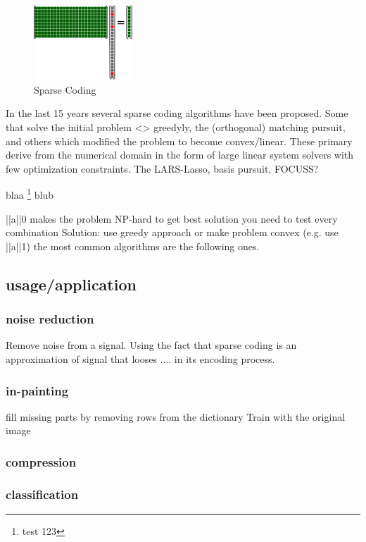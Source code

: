 \begin{figure}
\includegraphics[width = 0.33\textwidth]{images/Da_x.pdf} %
\caption{Sparse Coding}
\label{fig:da_x}
\end{figure}


In the last 15 years several sparse coding algorithms have been proposed. 
Some that solve the initial problem <> greedyly, the (orthogonal) matching pursuit, and others which modified the problem to become convex/linear. These primary derive from the numerical domain in the form of 
large linear system solvers with few optimization constraints. The LARS-Lasso, basis pursuit, FOCUSS?


blaa \footnote{test 123} blub

||a||0 makes the problem NP-hard
to get best solution you need to test every combination
Solution:
use greedy approach or make problem convex (e.g. use ||a||1)
the most common algorithms are the following ones.


\subsection{usage/application}
\subsubsection{noise reduction}
Remove noise from a signal. Using the fact that sparse coding 
is an approximation of signal that looses .... in its encoding process. 

\subsubsection{in-painting}
fill missing parts by removing rows from the dictionary
Train with the original image

\subsubsection{compression}
\subsubsection{classification}

